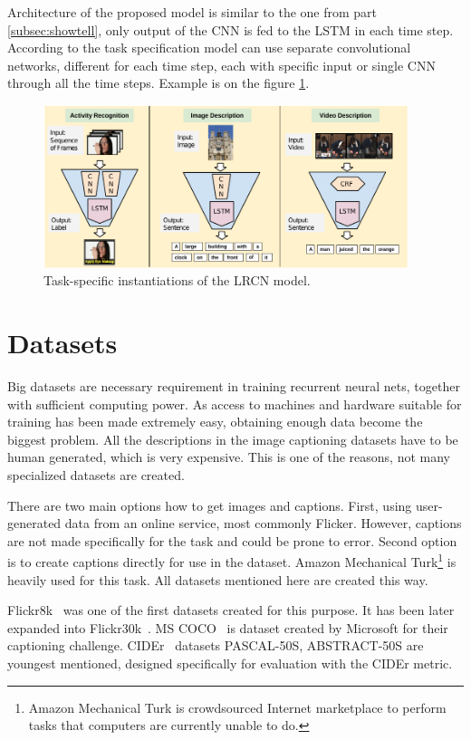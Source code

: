 Architecture of the proposed model is similar to the one from part \ref{subsec:showtell}, only output of the CNN is fed to the LSTM in each time step. According to the task specification model can use separate convolutional networks, different for each time step, each with specific input or single CNN through all the time steps. Example is on the figure \ref{fig:LRCN}.

\begin{figure}[!t]
	\centering
	\includegraphics[width=0.95\textwidth]{./fig/long-term-rec-con.pdf}
	\caption{Task-specific instantiations of the LRCN model.~\cite{DBLP:journals/corr/DonahueHGRVSD14}
		\label{fig:LRCN}}
\end{figure}

	\section{Datasets}
	\label{sec:datasets}
Big datasets are necessary requirement in training recurrent neural nets, together with sufficient computing power. As access to machines and hardware suitable for training has been made extremely easy, obtaining enough data become the biggest problem. All the descriptions in the image captioning datasets have to be human generated, which is very expensive. This is one of the reasons, not many specialized datasets are created.

There are two main options how to get images and captions. First, using user-generated data from an online service, most commonly Flicker. However, captions are not made specifically for the task and could be prone to error. Second option is to create captions directly for use in the dataset. Amazon Mechanical Turk\footnote{Amazon Mechanical Turk is crowdsourced Internet marketplace to perform tasks that computers are currently unable to do.} is heavily used for this task. All datasets mentioned here are created this way.

Flickr8k~\cite{dataset-flickr8k} was one of the first datasets created for this purpose. It has been later expanded into Flickr30k~\cite{dataset-flickr30k}. MS COCO~\cite{DBLP:journals/corr/ChenFLVGDZ15} is dataset created by Microsoft for their captioning challenge. CIDEr~\cite{Vedantam_2015_CVPR} datasets PASCAL-50S, ABSTRACT-50S are youngest mentioned, designed specifically for evaluation with the CIDEr metric.

